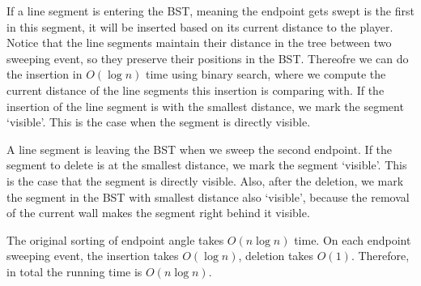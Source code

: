 \documentclass[12pt]{article}
\begin{document}
If a line segment is entering the BST, meaning the endpoint gets swept is the first in this segment, it will be inserted based on its current distance to the player. Notice that the line segments maintain their distance in the tree between two sweeping event, so they preserve their positions in the BST. Thereofre we can do the insertion in $O(\log n)$ time using binary search, where we compute the current distance of the line segments this insertion is comparing with. If the insertion of the line segment is with the smallest distance, we mark the segment `visible'. This is the case when the segment is directly visible. 
 
A line segment is leaving the BST when we sweep the second endpoint. If the segment to delete is at the smallest distance, we mark the segment `visible'. This is the case that the segment is directly visible. Also, after the deletion, we mark the segment in the BST with smallest distance also `visible', because the removal of the current wall makes the segment right behind it visible.

The original sorting of endpoint angle takes $O(n\log n)$ time. On each endpoint sweeping event, the insertion takes $O(\log n)$, deletion takes $O(1)$. Therefore, in total the running time is $O(n\log n)$.
\end{document}
